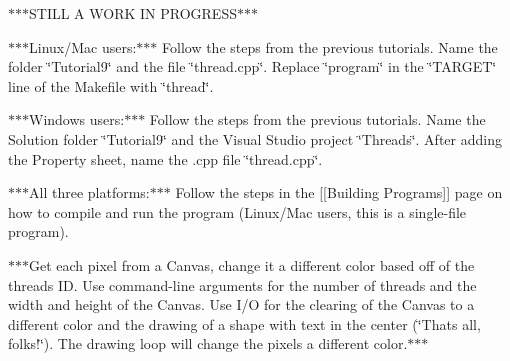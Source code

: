 $\ast$$\ast$$\ast$\+S\+T\+I\+L\+L A W\+O\+R\+K I\+N P\+R\+O\+G\+R\+E\+S\+S$\ast$$\ast$$\ast$

$\ast$$\ast$$\ast$\+Linux/\+Mac users\+:$\ast$$\ast$$\ast$ Follow the steps from the previous tutorials. Name the folder \char`\"{}\+Tutorial9\char`\"{} and the file \char`\"{}thread.\+cpp\char`\"{}. Replace \char`\"{}program\char`\"{} in the \char`\"{}\+T\+A\+R\+G\+E\+T\char`\"{} line of the Makefile with \char`\"{}thread\char`\"{}.

$\ast$$\ast$$\ast$\+Windows users\+:$\ast$$\ast$$\ast$ Follow the steps from the previous tutorials. Name the Solution folder \char`\"{}\+Tutorial9\char`\"{} and the Visual Studio project \char`\"{}\+Threads\char`\"{}. After adding the Property sheet, name the .cpp file \char`\"{}thread.\+cpp\char`\"{}.

$\ast$$\ast$$\ast$\+All three platforms\+:$\ast$$\ast$$\ast$ Follow the steps in the \mbox{[}\mbox{[}Building Programs\mbox{]}\mbox{]} page on how to compile and run the program (Linux/\+Mac users, this is a single-\/file program).

$\ast$$\ast$$\ast$\+Get each pixel from a Canvas, change it a different color based off of the thread\textquotesingle{}s I\+D. Use command-\/line arguments for the number of threads and the width and height of the Canvas. Use I/\+O for the clearing of the Canvas to a different color and the drawing of a shape with text in the center (\char`\"{}\+That\textquotesingle{}s all, folks!\char`\"{}). The drawing loop will change the pixels a different color.$\ast$$\ast$$\ast$ 